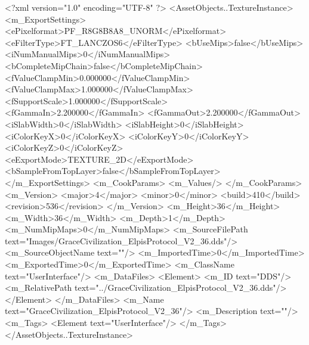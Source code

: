 <?xml version="1.0" encoding="UTF-8" ?>
<AssetObjects..TextureInstance>
	<m_ExportSettings>
		<ePixelformat>PF_R8G8B8A8_UNORM</ePixelformat>
		<eFilterType>FT_LANCZOS6</eFilterType>
		<bUseMips>false</bUseMips>
		<iNumManualMips>0</iNumManualMips>
		<bCompleteMipChain>false</bCompleteMipChain>
		<fValueClampMin>0.000000</fValueClampMin>
		<fValueClampMax>1.000000</fValueClampMax>
		<fSupportScale>1.000000</fSupportScale>
		<fGammaIn>2.200000</fGammaIn>
		<fGammaOut>2.200000</fGammaOut>
		<iSlabWidth>0</iSlabWidth>
		<iSlabHeight>0</iSlabHeight>
		<iColorKeyX>0</iColorKeyX>
		<iColorKeyY>0</iColorKeyY>
		<iColorKeyZ>0</iColorKeyZ>
		<eExportMode>TEXTURE_2D</eExportMode>
		<bSampleFromTopLayer>false</bSampleFromTopLayer>
	</m_ExportSettings>
	<m_CookParams>
		<m_Values/>
	</m_CookParams>
	<m_Version>
		<major>4</major>
		<minor>0</minor>
		<build>410</build>
		<revision>536</revision>
	</m_Version>
	<m_Height>36</m_Height>
	<m_Width>36</m_Width>
	<m_Depth>1</m_Depth>
	<m_NumMipMaps>0</m_NumMipMaps>
	<m_SourceFilePath text="Images/GraceCivilization_ElpisProtocol_V2_36.dds"/>
	<m_SourceObjectName text=""/>
	<m_ImportedTime>0</m_ImportedTime>
	<m_ExportedTime>0</m_ExportedTime>
	<m_ClassName text="UserInterface"/>
	<m_DataFiles>
		<Element>
			<m_ID text="DDS"/>
			<m_RelativePath text="../GraceCivilization_ElpisProtocol_V2_36.dds"/>
		</Element>
	</m_DataFiles>
	<m_Name text="GraceCivilization_ElpisProtocol_V2_36"/>
	<m_Description text=""/>
	<m_Tags>
		<Element text="UserInterface"/>
	</m_Tags>
</AssetObjects..TextureInstance>
